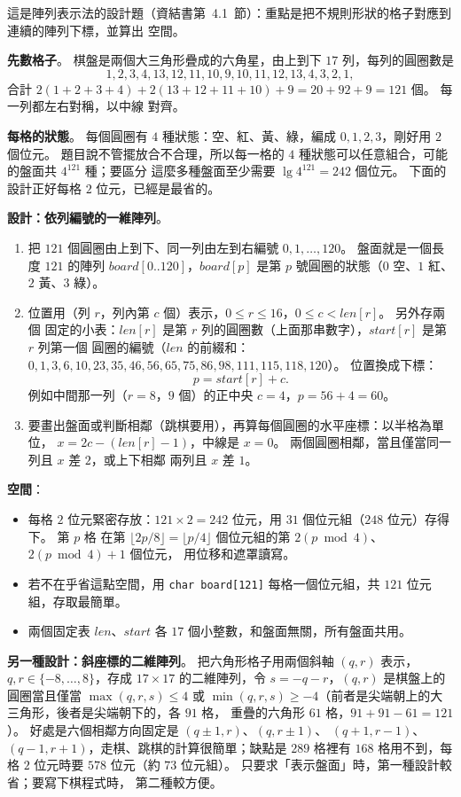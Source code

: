 \begin{pastsoln}
這是陣列表示法的設計題（資結書第~4.1~節）：重點是把不規則形狀的格子對應到連續的陣列下標，並算出
空間。

\textbf{先數格子}。 棋盤是兩個大三角形疊成的六角星，由上到下 $17$ 列，每列的圓圈數是
\[
1, 2, 3, 4, 13, 12, 11, 10, 9, 10, 11, 12, 13, 4, 3, 2, 1,
\]
合計 $2(1 + 2 + 3 + 4) + 2(13 + 12 + 11 + 10) + 9 = 20 + 92 + 9 = 121$ 個。 每一列都左右對稱，以中線
對齊。

\textbf{每格的狀態}。 每個圓圈有 $4$ 種狀態：空、紅、黃、綠，編成 $0, 1, 2, 3$，剛好用 $2$ 個位元。
題目說不管擺放合不合理，所以每一格的 $4$ 種狀態可以任意組合，可能的盤面共 $4^{121}$ 種；要區分
這麼多種盤面至少需要 $\lg 4^{121} = 242$ 個位元。 下面的設計正好每格 $2$ 位元，已經是最省的。

\textbf{設計：依列編號的一維陣列}。
\begin{enumerate}[label=(\arabic*)]
\item 把 $121$ 個圓圈由上到下、同一列由左到右編號 $0, 1, \ldots, 120$。 盤面就是一個長度 $121$ 的陣列
$\mathit{board}[0..120]$，$\mathit{board}[p]$ 是第 $p$ 號圓圈的狀態（$0$ 空、$1$ 紅、$2$ 黃、$3$ 綠）。
\item 位置用（列 $r$，列內第 $c$ 個）表示，$0 \le r \le 16$，$0 \le c < \mathit{len}[r]$。 另外存兩個
固定的小表：$\mathit{len}[r]$ 是第 $r$ 列的圓圈數（上面那串數字），$\mathit{start}[r]$ 是第 $r$ 列第一個
圓圈的編號（$\mathit{len}$ 的前綴和：$0, 1, 3, 6, 10, 23, 35, 46, 56, 65, 75, 86, 98, 111, 115, 118, 120$）。
位置換成下標：
\[
p = \mathit{start}[r] + c .
\]
例如中間那一列（$r = 8$，$9$ 個）的正中央 $c = 4$，$p = 56 + 4 = 60$。
\item 要畫出盤面或判斷相鄰（跳棋要用），再算每個圓圈的水平座標：以半格為單位，
$x = 2c - (\mathit{len}[r] - 1)$，中線是 $x = 0$。 兩個圓圈相鄰，當且僅當同一列且 $x$ 差 $2$，或上下相鄰
兩列且 $x$ 差 $1$。
\end{enumerate}
\textbf{空間}：
\begin{itemize}
\item 每格 $2$ 位元緊密存放：$121 \times 2 = 242$ 位元，用 $31$ 個位元組（$248$ 位元）存得下。 第 $p$ 格
在第 $\lfloor 2p / 8 \rfloor = \lfloor p/4 \rfloor$ 個位元組的第 $2(p \bmod 4)$、$2(p \bmod 4) + 1$ 個位元，
用位移和遮罩讀寫。
\item 若不在乎省這點空間，用 \texttt{char board[121]} 每格一個位元組，共 $121$ 位元組，存取最簡單。
\item 兩個固定表 $\mathit{len}$、$\mathit{start}$ 各 $17$ 個小整數，和盤面無關，所有盤面共用。
\end{itemize}

\textbf{另一種設計：斜座標的二維陣列}。 把六角形格子用兩個斜軸 $(q, r)$ 表示，$q, r \in
\{-8, \ldots, 8\}$，存成 $17 \times 17$ 的二維陣列，令 $s = -q - r$，$(q, r)$ 是棋盤上的圓圈當且僅當
$\max(q, r, s) \le 4$ 或 $\min(q, r, s) \ge -4$（前者是尖端朝上的大三角形，後者是尖端朝下的，各 $91$ 格，
重疊的六角形 $61$ 格，$91 + 91 - 61 = 121$）。 好處是六個相鄰方向固定是 $(q \pm 1, r)$、$(q, r \pm 1)$、
$(q + 1, r - 1)$、$(q - 1, r + 1)$，走棋、跳棋的計算很簡單；缺點是 $289$ 格裡有 $168$ 格用不到，每格
$2$ 位元時要 $578$ 位元（約 $73$ 位元組）。 只要求「表示盤面」時，第一種設計較省；要寫下棋程式時，
第二種較方便。
\end{pastsoln}
